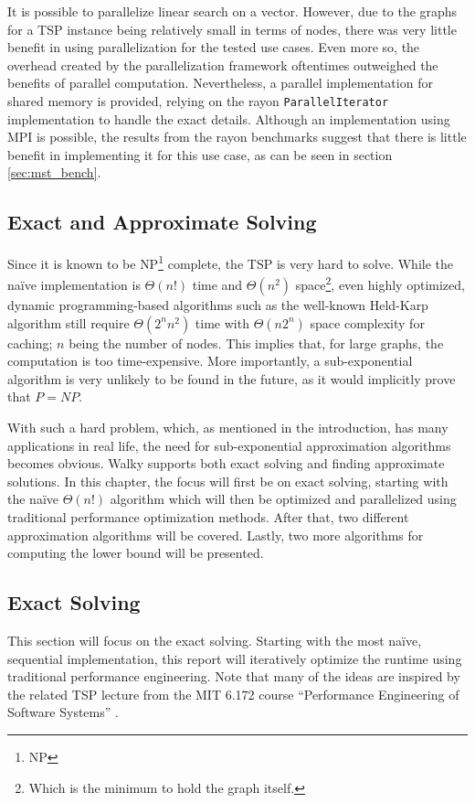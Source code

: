 It is possible to parallelize linear search on a vector.
However, due to the graphs for a \ac{TSP} instance being relatively small
in terms of nodes, there was very little benefit in using parallelization
for the tested use cases.
Even more so, the overhead created by the parallelization framework oftentimes
outweighed the benefits of parallel computation.
Nevertheless, a parallel implementation
for shared memory is provided,
relying on the rayon \texttt{ParallelIterator} implementation
to handle the exact details.
Although an implementation using \ac{MPI} is possible,
the results from the rayon benchmarks suggest that there
is little benefit in implementing it for this use case,
as can be seen in section \ref{sec:mst_bench}.

\subsection{Exact and Approximate Solving}
Since it is known to be \acs{NP}\footnote{\acf{NP}} complete, the \ac{TSP} is very hard to solve. While the na\"ive implementation is $\Theta(n!)$ time and $\Theta(n^2)$ space\footnote{Which is the minimum to hold the graph itself.}, even highly optimized, dynamic programming-based algorithms such as the well-known Held-Karp algorithm \cite{held_dynamic_1962} still require $\Theta(2^n n^2)$ time with $\Theta(n 2^n)$ space complexity for caching; $n$ being the number of nodes. This implies that, for large graphs, the computation is too time-expensive. More importantly, a sub-exponential algorithm is very unlikely to be found in the future, as it would implicitly prove that $P=NP$.

With such a hard problem, which, as mentioned in the introduction, has many applications in real life, the need for sub-exponential approximation algorithms becomes obvious. Walky supports both exact solving and finding approximate solutions. In this chapter, the focus will first be on exact solving, starting with the na\"ive $\Theta(n!)$ algorithm which will then be optimized and parallelized using traditional performance optimization methods. After that, two different approximation algorithms will be covered. Lastly, two more algorithms for computing the lower bound will be presented.

\subsection{Exact Solving}
This section will focus on the exact solving. Starting with the most na\"ive, sequential implementation, this report will iteratively optimize the runtime using traditional performance engineering. Note that many of the ideas are inspired by the related \ac{TSP} lecture from the MIT 6.172 course ``Performance Engineering of Software Systems'' \cite{bentley_lecture_2018}.

